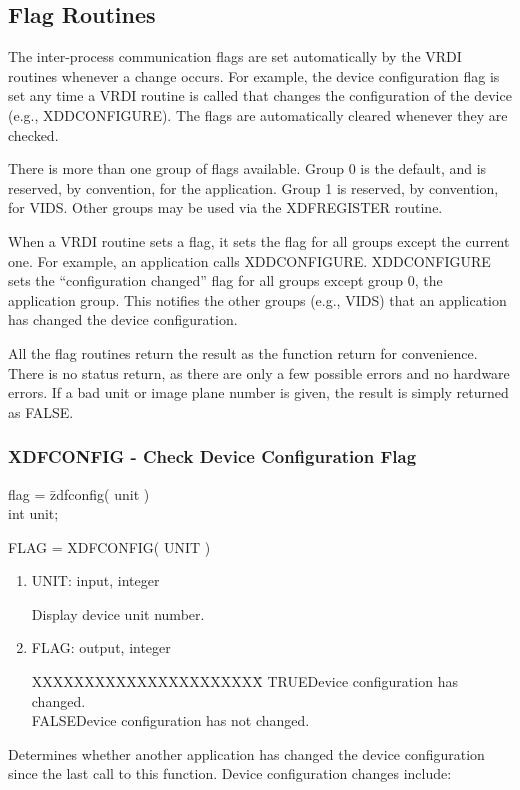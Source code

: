 \subsection{Flag Routines}
The inter-process communication flags are set automatically by the
VRDI routines whenever a change occurs.  For example, the device
configuration flag is set any time a VRDI routine is called that
changes the configuration of the device (e.g., XDDCONFIGURE).  The
flags are automatically cleared whenever they are checked.

There is more than one group of flags available.  Group 0 is the default,
and is reserved, by convention, for the application.  Group 1 is
reserved, by convention, for VIDS.  Other groups may be used via the
XDFREGISTER routine.

When a VRDI routine sets a flag, it sets the flag for all groups except
the current one.  For example, an application calls XDDCONFIGURE.
XDDCONFIGURE sets the ``configuration changed'' flag for all groups
except group 0, the application group.  This notifies the other groups
(e.g., VIDS) that an application has changed the device configuration.

All the flag routines return the result as the function return for
convenience.  There is no status return, as there are only a few possible
errors and no hardware errors.  If a bad unit or image plane number is
given, the result is simply returned as FALSE.
\newpage
\subsubsection{XDFCONFIG - Check Device Configuration Flag}
\begin{tabbing}
flag = \=zdfconfig( unit )\\
\>int  unit;\\
\end{tabbing}
FLAG = XDFCONFIG( UNIT )
\begin{enumerate}
\item UNIT:  input, integer

Display device unit number.
\item FLAG:  output, integer
\begin{tabbing}
XXXXXXXXXXXXXXXXXXXXXX\=\kill
TRUE\>Device configuration has changed.\\
FALSE\>Device configuration has not changed.\\
\end{tabbing}
\end{enumerate}
Determines whether another application has changed the device configuration
since the last call to this function.  Device configuration changes include:

